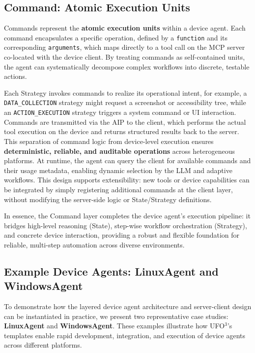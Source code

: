 \documentclass[10pt]{article} %
\newcommand{\ufo}{\textsc{UFO}$^3$\xspace}
\begin{document}
\subsection{Command: Atomic Execution Units}
Commands represent the \textbf{atomic execution units} within a device agent. Each command encapsulates a specific operation, defined by a \texttt{function} and its corresponding \texttt{arguments}, which maps directly to a tool call on the MCP server co-located with the device client. By treating commands as self-contained units, the agent can systematically decompose complex workflows into discrete, testable actions.

Each Strategy invokes commands to realize its operational intent, for example, a \texttt{DATA\_COLLECTION} strategy might request a screenshot or accessibility tree, while an \texttt{ACTION\_EXECUTION} strategy triggers a system command or UI interaction. Commands are transmitted via the AIP to the client, which performs the actual tool execution on the device and returns structured results back to the server. This separation of command logic from device-level execution ensures \textbf{deterministic, reliable, and auditable operations} across heterogeneous platforms. At runtime, the agent can query the client for available commands and their usage metadata, enabling dynamic selection by the LLM and adaptive workflows. This design supports extensibility: new tools or device capabilities can be integrated by simply registering additional commands at the client layer, without modifying the server-side logic or State/Strategy definitions.

In essence, the Command layer completes the device agent's execution pipeline: it bridges high-level reasoning (State), step-wise workflow orchestration (Strategy), and concrete device interaction, providing a robust and flexible foundation for reliable, multi-step automation across diverse environments.



\subsection{Example Device Agents: LinuxAgent and WindowsAgent}
To demonstrate how the layered device agent architecture and server-client design can be instantiated in practice, we present two representative case studies: \textbf{LinuxAgent} and \textbf{WindowsAgent}. These examples illustrate how \ufo's templates enable rapid development, integration, and execution of device agents across different platforms.
\end{document}
